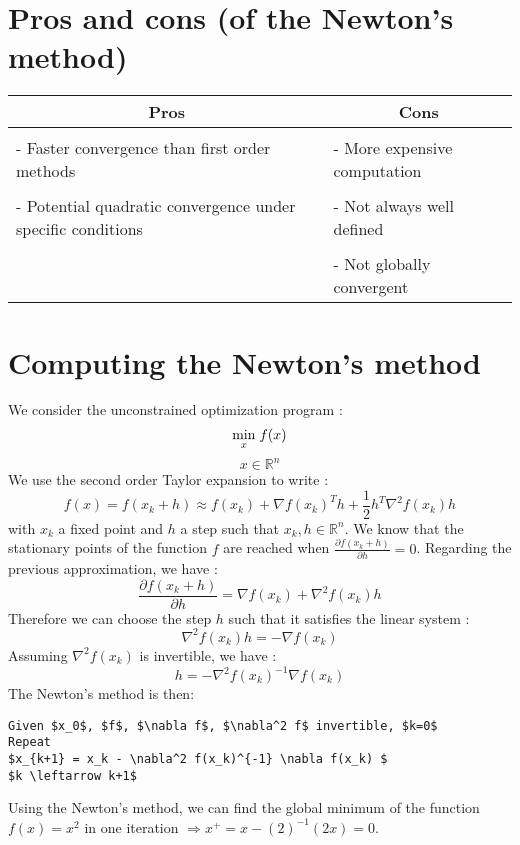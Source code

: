 \section{Pros and cons (of the Newton's method)}
\vspace{0.3cm}
\begin{tabular}{l|l}
\multicolumn{1}{c|}{Pros} & \multicolumn{1}{c}{Cons} \\ 
\hline
 & \\
- Faster convergence than first order methods & - More expensive computation \\
 & \\
- Potential quadratic convergence under specific conditions & - Not always well defined \\
 & \\
 & -  Not globally convergent 
\end{tabular}

\section{Computing the Newton's method}
We consider the unconstrained optimization program :
$$ \underset{x}{\min} \hspace{0.1cm} f(x) $$
$$ x \in \mathbb{R}^n $$
We use the second order Taylor expansion to write :
$$ f(x) = f(x_k + h) \approx f(x_k) + \nabla f(x_k)^T h + \frac{1}{2} h^T\nabla^2 f(x_k) h$$
with $x_k$ a fixed point and $h$ a step such that $x_k,h \in \mathbb{R}^n $. We know that the stationary points of the function $f$ are reached when $\frac{ \partial f(x_k+h)}{\partial h} = 0$. Regarding the previous approximation, we have :
$$\frac{ \partial f(x_k+h)}{\partial h} = \nabla f(x_k) + \nabla^2 f(x_k) h $$
Therefore we can choose the step $h$ such that it satisfies the linear system :
$$\nabla^2 f(x_k) h = -\nabla f(x_k) $$
Assuming $\nabla^2 f(x_k)$ is invertible, we have :
$$ h = -\nabla^2 f(x_k)^{-1} \nabla f(x_k)$$
The Newton's method is then:

\begin{lstlisting}[mathescape,caption=Newton Algorithm]
Given $x_0$, $f$, $\nabla f$, $\nabla^2 f$ invertible, $k=0$
Repeat
$x_{k+1} = x_k - \nabla^2 f(x_k)^{-1} \nabla f(x_k) $
$k \leftarrow k+1$
\end{lstlisting}

\begin{example}
\begin{leftbar} 
Using the Newton's method, we can find the global minimum of the function $f(x) = x^2$ in one iteration $ \Longrightarrow x^+ = x - (2)^{-1}(2x) = 0$.
\end{leftbar}
\end{example}

